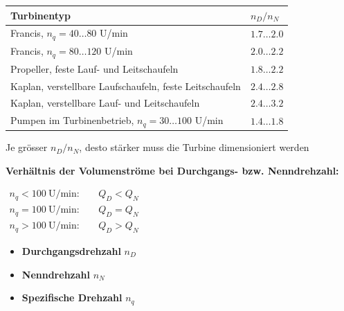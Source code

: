     \begin{tabular}{ll}
        \toprule[.13em]
        \textbf{Turbinentyp} & \({n_D}/{n_N}\) \\
        \midrule
        Francis, \(n_q = 40 \ldots 80\) U/min                       & \(1.7 \ldots 2.0\) \\
        Francis, \(n_q = 80 \ldots 120\) U/min                      & \(2.0 \ldots 2.2\) \\
        Propeller, feste Lauf- und Leitschaufeln                    & \(1.8 \ldots 2.2\) \\
        Kaplan, verstellbare Laufschaufeln, feste Leitschaufeln     & \(2.4 \ldots 2.8\) \\
        Kaplan, verstellbare Lauf- und Leitschaufeln                & \(2.4 \ldots 3.2\) \\
        Pumpen im Turbinenbetrieb, \(n_q = 30 \ldots 100\) U/min    & \(1.4 \ldots 1.8\) \\
        \bottomrule[.13em]
    \end{tabular}
    
    \vspace{0.15cm}
    
    Je grösser \({n_D}/{n_N}\), desto stärker muss die Turbine dimensioniert werden
    
    \newcolumn
    
    \textbf{Verhältnis der Volumenströme bei Durchgangs- bzw. Nenndrehzahl:}

    \begin{minipage}[t]{0.49\columnwidth}
        $\begin{aligned}
            n_q < 100 \ \mathrm{U/min:} & \quad Q_D < Q_N \\
            n_q = 100 \ \mathrm{U/min:} & \quad Q_D = Q_N \\
            n_q > 100 \ \mathrm{U/min:} & \quad Q_D > Q_N 
        \end{aligned}$
    \end{minipage}%
    \hfill
    \begin{minipage}[t]{0.49\columnwidth}
        \begin{itemize}
            \item \textbf{Durchgangsdrehzahl} \(n_D\)
            \item \textbf{Nenndrehzahl} \(n_N\)
            \item \textbf{Spezifische Drehzahl} \(n_q\)
        \end{itemize}
    \end{minipage}

